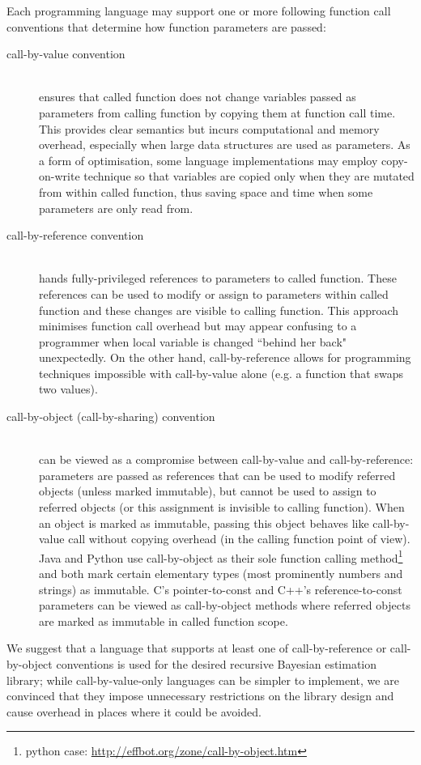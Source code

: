 Each programming language may support one or more following function call conventions that determine
how function parameters are passed:
\begin{description}
	\item[call-by-value convention] \hfill \\
		ensures that called function does not change variables passed as parameters from calling
		function by copying them at function call time. This provides clear semantics but incurs
		computational and memory overhead, especially when large data structures are used as
		parameters. As a form of optimisation, some language implementations may employ
		copy-on-write technique so that variables are copied only when they are mutated from within
		called function, thus saving space and time when some parameters are only read from.
	\item[call-by-reference convention] \hfill \\
		hands fully-privileged references to parameters to called function. These references can be
		used to modify or assign to parameters within called function and these changes are visible
		to calling function. This approach minimises function call overhead but may appear confusing
		to a programmer when local variable is changed ``behind her back" unexpectedly. On the other
		hand, call-by-reference allows for programming techniques impossible with call-by-value
		alone (e.g. a function that swaps two values).
	\item[call-by-object (call-by-sharing) convention] \hfill \\
		can be viewed as a compromise between call-by-value and call-by-reference: parameters are
		passed as references that can be used to modify referred objects (unless marked immutable),
		but cannot be used to assign to referred objects (or this assignment is invisible to calling
		function). When an object is marked as immutable,
		passing this object behaves like call-by-value call without copying overhead (in the calling
		function point of view). Java and Python use call-by-object as their sole function calling
		method\footnote{python case: \url{http://effbot.org/zone/call-by-object.htm}} and both mark
		certain elementary types (most prominently numbers and strings) as immutable. C's
		pointer-to-const and C++'s reference-to-const parameters can be viewed as call-by-object
		methods where referred objects are marked as immutable in called function scope.
\end{description}
We suggest that a language that supports at least one of call-by-reference or call-by-object
conventions is used for the desired recursive Bayesian estimation library; while call-by-value-only
languages can be simpler to implement, we are convinced that they impose unnecessary restrictions
on the library design and cause overhead in places where it could be avoided.

